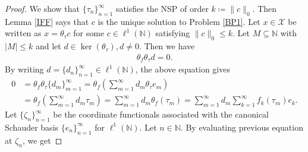 \documentclass{amsart}
\begin{document}
\begin{proof}
We show that $\{\tau_n \}_{n=1}^\infty$ satisfies the  NSP of order $k\coloneqq \|c\|_0$. Then Lemma \ref{IFF} says that $c$ is the unique solution to Problem \ref{BP1}. Let  $x \in \mathcal{X}$  be written as  $	x=\theta_\tau c$ for some  $c \in \ell^1(\mathbb{N})$ satisfying $\|c\|_0\leq k$. Let $ M \subseteq \mathbb{N} $ with $|M|\leq k$ and let $d \in \ker(\theta_\tau), d \neq 0$. Then we have 
\begin{align*}
	\theta_f\theta_\tau d=0.
\end{align*}
By writing  $d=\{d_n\}_{n=1}^\infty\in \ell^1(\mathbb{N})$, the above equation gives 
\begin{align*}
0&=\theta_f\theta_\tau\{d_m\}_{m=1}^\infty=\theta_f\left(\sum_{m=1}^{\infty}d_m\theta_\tau e_m\right)\\
&=\theta_f\left(\sum_{m=1}^{\infty}d_m\tau_m\right)=
\sum_{m=1}^{\infty}d_m\theta_f(\tau_m)=\sum_{m=1}^{\infty}d_m\sum_{k=1}^{\infty}f_k(\tau_m)e_k.
\end{align*}
Let $\{\zeta_n \}_{n=1}^\infty$ be the coordinate functionals associated with the canonical Schauder basis  $\{e_n \}_{n=1}^\infty$ for   $\ell^1(\mathbb{N})$. Let $n \in \mathbb{N} $. By evaluating previous equation at $\zeta_n$, we get 


\end{proof}
\end{document}
